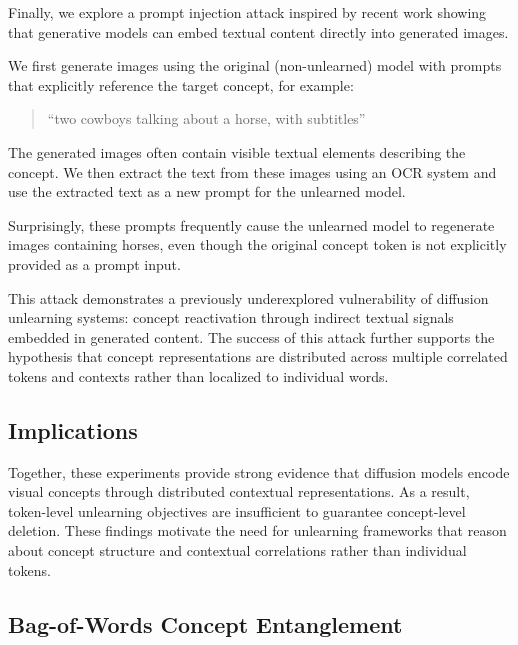 Finally, we explore a prompt injection attack inspired by recent work showing that generative models can embed textual content directly into generated images.

We first generate images using the original (non-unlearned) model with prompts that explicitly reference the target concept, for example:

\begin{quote}
``two cowboys talking about a horse, with subtitles''
\end{quote}

The generated images often contain visible textual elements describing the concept. We then extract the text from these images using an OCR system and use the extracted text as a new prompt for the unlearned model.

Surprisingly, these prompts frequently cause the unlearned model to regenerate images containing horses, even though the original concept token is not explicitly provided as a prompt input.

This attack demonstrates a previously underexplored vulnerability of diffusion unlearning systems: concept reactivation through indirect textual signals embedded in generated content. The success of this attack further supports the hypothesis that concept representations are distributed across multiple correlated tokens and contexts rather than localized to individual words.

\subsection{Implications}

Together, these experiments provide strong evidence that diffusion models encode visual concepts through distributed contextual representations. As a result, token-level unlearning objectives are insufficient to guarantee concept-level deletion. These findings motivate the need for unlearning frameworks that reason about concept structure and contextual correlations rather than individual tokens.

\subsection{Bag-of-Words Concept Entanglement}


